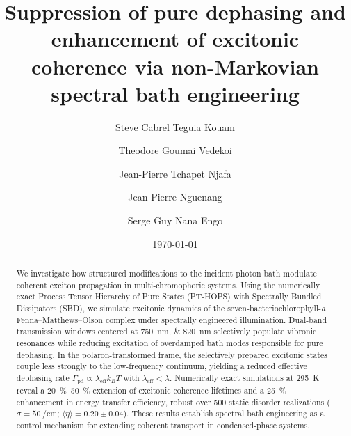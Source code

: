 \documentclass[aip,jcp,preprint]{revtex4-2}
\begin{document}
\title{Suppression of pure dephasing and enhancement of excitonic coherence via non-Markovian spectral bath engineering}

\author{Steve Cabrel Teguia Kouam}

\author{Theodore Goumai Vedekoi}

\author{Jean-Pierre Tchapet Njafa}

\author{Jean-Pierre Nguenang}

\author{Serge Guy Nana Engo}

\date{\today}

\begin{abstract}
We investigate how structured modifications to the incident photon bath modulate coherent exciton propagation in multi-chromophoric systems. Using the numerically exact Process Tensor Hierarchy of Pure States (PT-HOPS) with Spectrally Bundled Dissipators (SBD), we simulate excitonic dynamics of the seven-bacteriochlorophyll-\textit{a} Fenna--Matthews--Olson complex under spectrally engineered illumination. Dual-band transmission windows centered at \SIlist{750;820}{\nano\meter} selectively populate vibronic resonances while reducing excitation of overdamped bath modes responsible for pure dephasing. In the polaron-transformed frame, the selectively prepared excitonic states couple less strongly to the low-frequency continuum, yielding a reduced effective dephasing rate $\Gamma_{\mathrm{pd}} \propto \lambda_{\mathrm{eff}} k_B T$ with $\lambda_{\mathrm{eff}} < \lambda$. Numerically exact simulations at \SI{295}{\kelvin} reveal a \SIrange{20}{50}{\percent} extension of excitonic coherence lifetimes and a \SI{25}{\percent} enhancement in energy transfer efficiency, robust over \num{500} static disorder realizations ($\sigma = \SI{50}{\per\centi\meter}$; $\langle\eta\rangle = 0.20 \pm 0.04$). These results establish spectral bath engineering as a control mechanism for extending coherent transport in condensed-phase systems.
\end{abstract}
\end{document}
